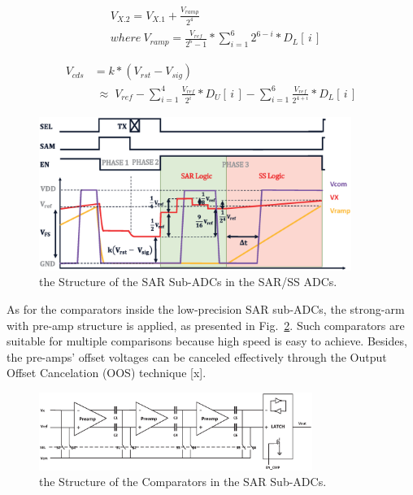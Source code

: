 \documentclass[conference]{IEEEtran}
\begin{document}
\begin{equation}
	\begin{aligned}
	&V_{X.2}=V_{X.1}+\frac{V_{ramp}}{2^4}\\ &where\  V_{ramp}=\frac{V_{ref}}{2^6-1}\ast\sum_{i=1}^{6}2^{6-i}\ast{D_{L}\left[\,i\,\right]}
	\label{eq5}
	\end{aligned}	
\end{equation}

\begin{equation}
	\begin{aligned}
	V_{cds}&=k\ast(V_{rst}-V_{sig})\\
	&\;{\approx}\;{V_{ref}-\sum_{i=1}^{4} \frac{V_{ref}}{2^{i}}\ast{D_{U}\left[\,i\,\right]}-\sum_{i=1}^{6} \frac{V_{ref}}{2^{4+i}}\ast{D_{L}\left[\,i\,\right]}}
	\label{eq6}
	\end{aligned}
\end{equation}

\begin{figure}[htbp]
	\centerline{\includegraphics[width=4in]{./Figures/SARWAVE.eps}}
	\caption{the Structure of the SAR Sub-ADCs in the SAR/SS ADCs.}
	\label{SARWAVE}
\end{figure} 

As for the comparators inside the low-precision SAR sub-ADCs, the strong-arm with pre-amp structure is applied, as presented in Fig.~\ref{LATCH}. Such comparators are suitable for multiple comparisons because high speed is easy to achieve. Besides, the pre-amps’ offset voltages can be canceled effectively through the Output Offset Cancelation (OOS) technique [x].

\begin{figure}[htbp]
	\centerline{\includegraphics[width=3.5in]{./Figures/LATCH.eps}}
	\caption{the Structure of the Comparators in the SAR Sub-ADCs.}
	\label{LATCH}
\end{figure} 
\end{document}
